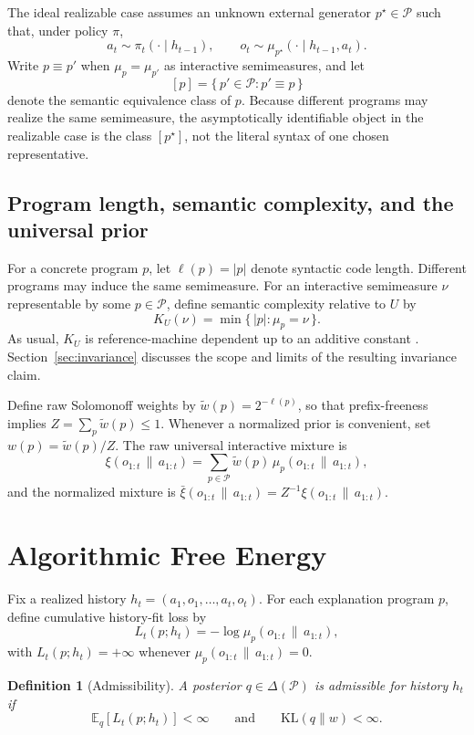 \documentclass[11pt]{article}
\newtheorem{definition}{Definition}[section]
\theoremstyle{remark}
\newcommand{\Pcal}{\mathcal{P}}
\newcommand{\E}{\mathbb{E}}
\newcommand{\KL}{\mathrm{KL}}
\newcommand{\givena}{\,\|\,}
\newcommand{\ellp}{\ell}
\newcommand{\wt}{\widetilde}
\newcommand{\barxi}{\bar{\xi}}
\begin{document}
The ideal realizable case assumes an unknown external generator \(p^\star \in \Pcal\) such that, under policy \(\pi\),
\[
a_t \sim \pi_t(\cdot \mid h_{t-1}),
\qquad
o_t \sim \mu_{p^\star}(\cdot \mid h_{t-1}, a_t).
\]
Write \(p \equiv p'\) when \(\mu_p = \mu_{p'}\) as interactive semimeasures, and let
\[
[p] = \{\, p' \in \Pcal : p' \equiv p \,\}
\]
denote the semantic equivalence class of \(p\). Because different programs may realize the same semimeasure, the asymptotically identifiable object in the realizable case is the class \([p^\star]\), not the literal syntax of one chosen representative.

\subsection{Program length, semantic complexity, and the universal prior}

For a concrete program \(p\), let \(\ellp(p) = |p|\) denote syntactic code length. Different programs may induce the same semimeasure. For an interactive semimeasure \(\nu\) representable by some \(p \in \Pcal\), define semantic complexity relative to \(U\) by
\[
K_U(\nu) = \min \{\, |p| : \mu_p = \nu \,\}.
\]
As usual, \(K_U\) is reference-machine dependent up to an additive constant \citep{Kolmogorov1965,Chaitin1975}. Section~\ref{sec:invariance} discusses the scope and limits of the resulting invariance claim.

Define raw Solomonoff weights by \(\wt{w}(p) = 2^{-\ellp(p)}\), so that prefix-freeness implies \(Z = \sum_{p} \wt{w}(p) \le 1\). Whenever a normalized prior is convenient, set \(w(p) = \wt{w}(p)/Z\). The raw universal interactive mixture is
\[
\xi(o_{1:t} \givena a_{1:t})
= \sum_{p \in \Pcal} \wt{w}(p)\,\mu_p(o_{1:t} \givena a_{1:t}),
\]
and the normalized mixture is \(\barxi(o_{1:t} \givena a_{1:t}) = Z^{-1}\xi(o_{1:t} \givena a_{1:t})\).

\section{Algorithmic Free Energy}
\label{sec:fe}

Fix a realized history \(h_t = (a_1,o_1,\dots,a_t,o_t)\). For each explanation program \(p\), define cumulative history-fit loss by
\[
L_t(p;h_t) = -\log \mu_p(o_{1:t} \givena a_{1:t}),
\]
with \(L_t(p;h_t)=+\infty\) whenever \(\mu_p(o_{1:t}\givena a_{1:t})=0\).

\begin{definition}[Admissibility]
A posterior \(q \in \Delta(\Pcal)\) is \emph{admissible} for history \(h_t\) if
\[
\E_q[L_t(p;h_t)] < \infty
\qquad\text{and}\qquad
\KL(q \| w) < \infty.
\]
\end{definition}
\end{document}
